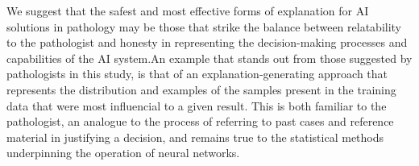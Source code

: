 We suggest that the safest and most effective forms of explanation for AI solutions in pathology may be those that strike the balance between relatability to the pathologist and honesty in representing the decision-making processes and capabilities of the AI system.An example that stands out from those suggested by pathologists in this study, is that of an explanation-generating approach that represents the distribution and examples of the samples present in the training data that were most influencial to a given result. This is both familiar to the pathologist, an analogue to the process of referring to past cases and reference material in justifying a decision, and remains true to the statistical methods underpinning the operation of neural networks.




